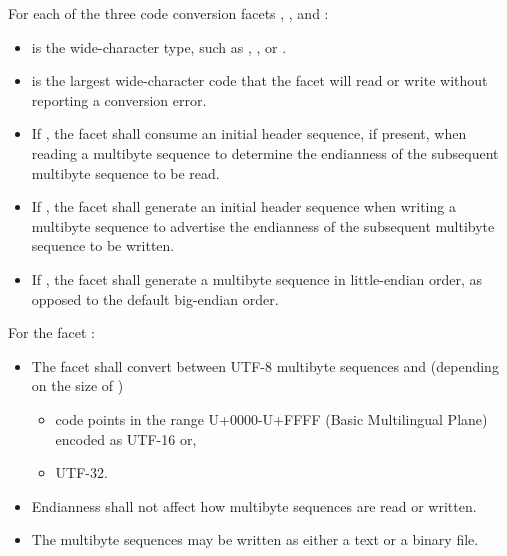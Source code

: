 \documentclass{wg21}
\begin{document}
\pnum
For each of the three code conversion facets ,
, and :
\begin{itemize}
    \item
     is the wide-character type, such as
    , , or .
    \item
     is the largest wide-character code that the facet
    will read or write without reporting a conversion error.
    \item
    If , the facet shall consume an
    initial header sequence, if present, when reading a multibyte sequence
    to determine the endianness of the subsequent multibyte sequence to be read.
    \item
    If , the facet shall generate an
    initial header sequence when writing a multibyte sequence to advertise
    the endianness of the subsequent multibyte sequence to be written.
    \item
    If , the facet shall generate a
    multibyte sequence in little-endian order,
    as opposed to the default big-endian order.
\end{itemize}

\pnum
{}%
%
%
For the facet :
\begin{itemize}
    \item
    The facet shall convert between UTF-8 multibyte sequences
    and  (depending on the size of )
    \begin{addedblock}
    \begin{itemize}
        \item code points in the range U+0000-U+FFFF (Basic Multilingual Plane) encoded as UTF-16 or,
        \item UTF-32.
    \end{itemize}
    \end{addedblock}
    \item
    Endianness shall not affect how multibyte sequences are read or written.
    \item
    The multibyte sequences may be written as either a text or a binary file.
\end{itemize}
\end{document}
